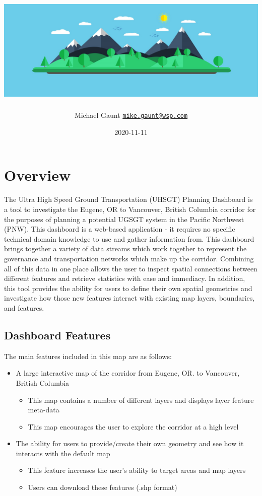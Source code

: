\documentclass[
]{article}
\title{\includegraphics[width=9in,height=\textheight]{./www/flatart_long.jpg}}
\author{Michael Gaunt
\href{mailto:mike.gaunt@wsp.com}{\nolinkurl{mike.gaunt@wsp.com}}}
\date{2020-11-11}
\providecommand{\tightlist}{%
  \setlength{\itemsep}{0pt}\setlength{\parskip}{0pt}}
\begin{document}
\maketitle

{
\setcounter{tocdepth}{2}
\tableofcontents
}
\hypertarget{overview}{%
\section{Overview}\label{overview}}

The Ultra High Speed Ground Transportation (UHSGT) Planning Dashboard is
a tool to investigate the Eugene, OR to Vancouver, British Columbia
corridor for the purposes of planning a potential UGSGT system in the
Pacific Northwest (PNW). This dashboard is a web-based application - it
requires no specific technical domain knowledge to use and gather
information from. This dashboard brings together a variety of data
streams which work together to represent the governance and
transportation networks which make up the corridor. Combining all of
this data in one place allows the user to inspect spatial connections
between different features and retrieve statistics with ease and
immediacy. In addition, this tool provides the ability for users to
define their own spatial geometries and investigate how those new
features interact with existing map layers, boundaries, and features.

\hypertarget{dashboard-features}{%
\subsection{Dashboard Features}\label{dashboard-features}}

The main features included in this map are as follows:

\begin{itemize}
\tightlist
\item
  A large interactive map of the corridor from Eugene, OR. to Vancouver,
  British Columbia

  \begin{itemize}
  \tightlist
  \item
    This map contains a number of different layers and displays layer
    feature meta-data
  \item
    This map encourages the user to explore the corridor at a high level
  \end{itemize}
\item
  The ability for users to provide/create their own geometry and see how
  it interacts with the default map

  \begin{itemize}
  \tightlist
  \item
    This feature increases the user's ability to target areas and map
    layers
  \item
    Users can download these features (.shp format)
  \end{itemize}
\end{itemize}
\end{document}
